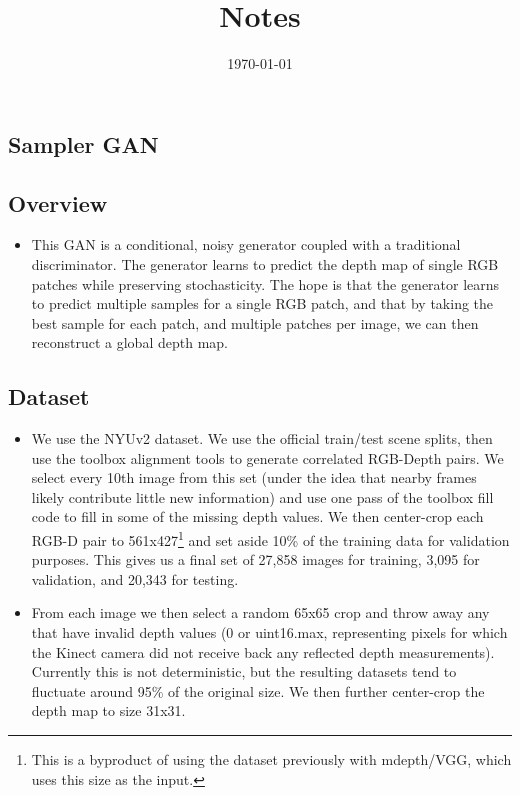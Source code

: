 \documentclass{article}
\date{\today}
\title{Notes}
\begin{document}
\begin{flushleft}
  \section{Sampler GAN}

  \subsection{Overview}
  \begin{itemize}
  \item This GAN is a conditional, noisy generator coupled with a traditional discriminator.
  The generator learns to predict the depth map of single RGB patches while preserving stochasticity.
  The hope is that the generator learns to predict multiple samples for a single RGB patch, and that by taking the best sample for each patch, and multiple patches per image, we can then reconstruct a global depth map.
  \end{itemize}

  \subsection{Dataset}

  \begin{itemize}
  \item We use the NYUv2 dataset.
  We use the official train/test scene splits, then use the toolbox alignment tools to generate correlated RGB-Depth pairs.
  We select every 10th image from this set (under the idea that nearby frames likely contribute little new information) and use one pass of the toolbox fill code to fill in some of the missing depth values.
  We then center-crop each RGB-D pair to 561x427\footnote{This is a byproduct of using the dataset previously with mdepth/VGG, which uses this size as the input.} and set aside 10\% of the training data for validation purposes.
  This gives us a final set of 27,858 images for training, 3,095 for validation, and 20,343 for testing.

\item From each image we then select a random 65x65 crop and throw away any that have invalid depth values (0 or uint16.max, representing pixels for which the Kinect camera did not receive back any reflected depth measurements). Currently
  this is not deterministic, but the resulting datasets tend to fluctuate around 95\% of the original size. We then further center-crop the depth map to size 31x31.
  

\end{itemize}
\end{flushleft}
\end{document}
